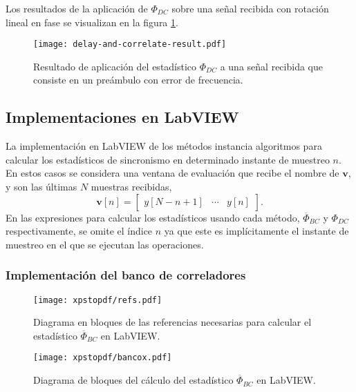 Los resultados de la aplicación de $\Phi_{DC}$ sobre una señal recibida con rotación lineal en fase se visualizan en la figura \ref{fig:dac-result}.
\begin{figure}[t]
    \centering{}\texttt{[image: delay-and-correlate-result.pdf]}
    \caption{Resultado de aplicación del estadístico $\Phi_{DC}$ a una señal recibida que consiste en un preámbulo con error de frecuencia.\label{fig:dac-result}}  
\end{figure}


\subsection{Implementaciones en LabVIEW}
\label{Ss:ch3-labview}

La implementación en LabVIEW de los métodos instancia algoritmos para calcular los estadísticos de sincronismo en determinado instante de muestreo $n$. En estos casos se considera una ventana de evaluación que recibe el nombre de $\mathbf{v}$, y son las últimas $N$ muestras recibidas,
\begin{equation}
    \mathbf{v}[n] = 
    \begin{bmatrix}
        y[N-n+1] &  \cdots & y[n]
    \end{bmatrix}.
\end{equation}
En las expresiones para calcular los estadísticos usando cada método, $\overline{\Phi}_{BC}$ y $\Phi_{DC}$ respectivamente, se omite el índice $n$ ya que este es implícitamente el instante de muestreo en el que se ejecutan las operaciones. 


\subsubsection{Implementación del banco de correladores}

\begin{figure}[t]
    \centering{}\texttt{[image: xpstopdf/refs.pdf]}
    \caption{Diagrama en bloques de las referencias necesarias para calcular el estadístico $\overline{\Phi}_{BC}$ en LabVIEW.\label{fig:refs_lv}}  
\end{figure}

\begin{figure}[t]
    \centering{}\texttt{[image: xpstopdf/bancox.pdf]}
    \caption{Diagrama de bloques del cálculo del estadístico $\overline{\Phi}_{BC}$ en LabVIEW.\label{fig:bancox_lv}}  
\end{figure}

